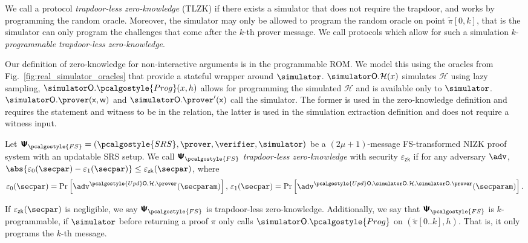 \documentclass[10pt]{llncs}
\newcommand{\SRScer}{\pcalgostyle{SRS}}
\newcommand{\simO}{\simulator\oracleo}
\newcommand{\simOH}{\simO.\ro}
\newcommand{\simOP}{\simO.\prover}
\newcommand{\initU}{\pcalgostyle{Upd}\oracleo}
\newcommand{\pcvarstyle}[1]{\mathsf{#1}}
\newcommand{\eps}{\varepsilon}
\newcommand{\oracleo}{\mathsf{O}}
\newcommand{\srs}{\pcvarstyle{srs}}
\newcommand{\zkproof}{\pi}
\newcommand{\tzkproof}{\tilde{\zkproof}}
\newcommand{\proofsystem}{\pcschemestyle{\Psi}}
\newcommand{\ps}{\proofsystem}
\newcommand{\psfs}{\proofsystem_\fs}
\newcommand{\ro}{\mathcal{H}}
\newcommand{\fs}{\pcalgostyle{FS}}
\newcommand{\pcschemestyle}[1]{\bm{\mathsf{#1}}}
\newcommand{\inp}{\pcvarstyle{x}}
\newcommand{\wit}{\pcvarstyle{w}}
\newcommand{\prog}{\pcalgostyle{Prog}}
\newcommand{\epszk}{\eps_{\pcvarstyle{zk}}}
\DeclareRobustCommand{\markulf}[2] {}%
\begin{document}
\markulf{22.04}{We don't consider SRS-simulators in this paper. I would simplify and move the above after the Updatable SRS scheme section, or maybe the start of Section 3.}
\fi

We call a protocol \emph{trapdoor-less
	zero-knowledge} (TLZK) if there exists a simulator that does not require the trapdoor, and works by programming the random oracle.
Moreover, the simulator may only be allowed to program the random oracle on point $\tzkproof[0,k]$, that is the simulator can only program the challenges that come after the $k$-th prover message. We call protocols which allow for such a simulation $k$-\emph{programmable trapdoor-less zero-knowledge}. %

Our definition of zero-knowledge for non-interactive
arguments is in the programmable ROM.
We model this using the oracles from Fig.~\ref{fig:real_simulator_oracles} that provide a stateful wrapper around $\simulator$.
$\simOH (x)$ simulates $\ro$ using lazy sampling, $\simulator\oracleo.\prog(x, h)$ allows for programming the simulated $\ro$ and is available only to $\simulator$. $\simOP(\inp, \wit)$ and $\simOP'(\inp)$ call the simulator. The former is used in the zero-knowledge definition and requires the statement and witness to be in the relation, the latter is used in the simulation extraction definition and does not require a witness input.

\begin{definition}
	\label{def:TLZK}
	Let 
	$\psfs = (\SRScer, \prover, \verifier, \simulator)$ be a $(2\mu + 1)$-message FS-transformed NIZK proof system with an updatable SRS setup. %
	We call $\psfs$ \emph{trapdoor-less zero-knowledge} with security $\epszk$ if for any
	adversary $\adv$, $\abs{\eps_0(\secpar) - \eps_1(\secpar)} \leq \epszk(\secpar)$, where
	\begin{align*}
	\eps_0 (\secpar) = \Pr\left[ \adv^{\initU, \ro, \prover} (\secparam) \right],\,
	\eps_1 (\secpar)=  \Pr \left[\adv^{\initU, \simOH, \simOP} (\secparam) \right].
	\end{align*}
	
	If $\epszk(\secpar)$ is negligible, we say $\ps_{\fs}$ is trapdoor-less zero-knowledge. Additionally, we say that $\ps_{\fs}$ is $k$-programmable, if  $\simulator$ before returning a proof $\pi$ only calls $\simulator\oracleo.\prog$ on $(\tzkproof[0..k],h)$. That is, it only programs the $k$-th message.
\end{definition}
\end{document}

